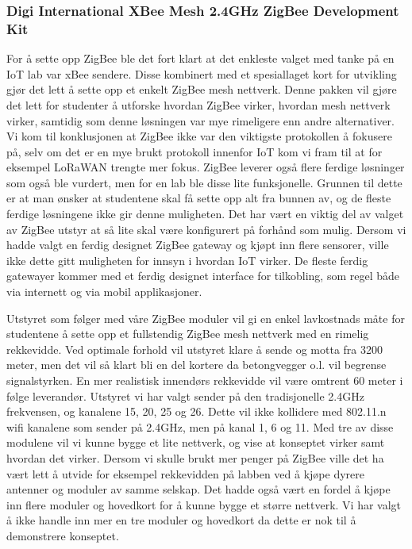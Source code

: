 \documentclass{article}
\begin{document}
\subsubsection{Digi International XBee Mesh 2.4GHz ZigBee Development Kit}
For å sette opp ZigBee ble det fort klart at det enkleste valget med tanke på en IoT lab var xBee sendere. Disse kombinert med et spesiallaget kort for utvikling gjør det lett å sette opp et enkelt ZigBee mesh nettverk. Denne pakken vil gjøre det lett for studenter å utforske hvordan ZigBee virker, hvordan mesh nettverk virker, samtidig som denne løsningen var mye rimeligere enn andre alternativer. Vi kom til konklusjonen at ZigBee ikke var den viktigste protokollen å fokusere på, selv om det er en mye brukt protokoll innenfor IoT kom vi fram til at for eksempel LoRaWAN trengte mer fokus. ZigBee leverer også flere ferdige løsninger som også ble vurdert, men for en lab ble disse lite funksjonelle. Grunnen til dette er at man ønsker at studentene skal få sette opp alt fra bunnen av, og de fleste ferdige løsningene ikke gir denne muligheten. Det har vært en viktig del av valget av ZigBee utstyr at så lite skal være konfigurert på forhånd som mulig. Dersom vi hadde valgt en ferdig designet ZigBee gateway og kjøpt inn flere sensorer, ville ikke dette gitt muligheten for innsyn i hvordan IoT virker. De fleste ferdig gatewayer kommer med et ferdig designet interface for tilkobling, som regel både via internett og via mobil applikasjoner. 

Utstyret som følger med våre ZigBee moduler vil gi en enkel lavkostnads måte for studentene å sette opp et fullstendig ZigBee mesh nettverk med en rimelig rekkevidde. Ved optimale forhold vil utstyret klare å sende og motta fra 3200 meter, men det vil så klart bli en del kortere da betongvegger o.l. vil begrense signalstyrken.  En mer realistisk innendørs rekkevidde vil være omtrent 60 meter i følge leverandør. Utstyret vi har valgt sender på den tradisjonelle 2.4GHz frekvensen, og kanalene  15, 20, 25 og 26. Dette vil ikke kollidere med 802.11.n wifi kanalene som sender på 2.4GHz, men på kanal 1, 6 og 11. Med tre av disse modulene vil vi kunne bygge et lite nettverk, og vise at konseptet virker samt hvordan det virker. 
Dersom vi skulle brukt mer penger på ZigBee ville det ha vært lett å utvide for eksempel rekkevidden på labben ved å kjøpe dyrere antenner og moduler av samme selskap. Det hadde også vært en fordel å kjøpe inn flere moduler og hovedkort for å kunne bygge et større nettverk. Vi har valgt å ikke handle inn mer en tre moduler og hovedkort da dette er nok til å demonstrere konseptet.
\end{document}
